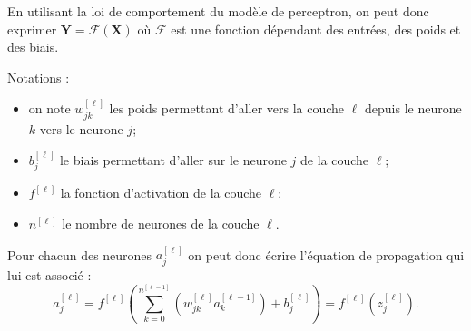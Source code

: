 \begin{defi}[Couches]
En utilisant la loi de comportement du modèle de perceptron, on peut donc exprimer $\mathbf{Y}=\mathcal{F}\left(\mathbf{X}\right)$ 
où $\mathcal{F}$ est une fonction dépendant des entrées, des poids et des biais.


Notations : 
\begin{itemize}
\item on note $w^{[\ell]}_{jk}$ les poids permettant d'aller vers la couche $\ell$ depuis le neurone $k$ vers le neurone $j$;
\item $b^{[\ell]}_{j}$ le biais permettant d'aller sur le neurone $j$ de la couche $\ell$;
\item $f^{[\ell]}$ la fonction d'activation de la couche $\ell$;
\item $n^{[\ell]}$ le nombre de neurones de la couche $\ell$.
\end{itemize}
\end{defi}

\begin{defi}

Pour chacun des neurones $a_j^{[\ell]}$ on peut donc écrire l'équation de propagation qui lui est associé : 
$$
a_j^{[\ell]} = f^{[\ell]}\left(\sum\limits_{k=0}^{n^{[\ell-1]}}\left( w^{[\ell]}_{jk} a_k^{[\ell-1]} \right) + b^{[\ell]}_{j}\right) = f^{[\ell]}\left(z_j^{[\ell]}\right).
$$

\end{defi}


